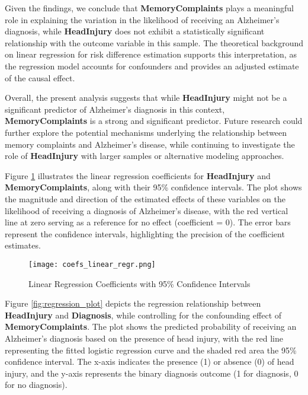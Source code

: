 \documentclass[12pt]{article}
\begin{document}
Given the findings, we conclude that \textbf{MemoryComplaints} plays a meaningful role in explaining the variation in the likelihood of receiving an Alzheimer's diagnosis, while \textbf{HeadInjury} does not exhibit a statistically significant relationship with the outcome variable in this sample. The theoretical background on linear regression for risk difference estimation supports this interpretation, as the regression model accounts for confounders and provides an adjusted estimate of the causal effect.

Overall, the present analysis suggests that while \textbf{HeadInjury} might not be a significant predictor of Alzheimer's diagnosis in this context, \textbf{MemoryComplaints} is a strong and significant predictor. Future research could further explore the potential mechanisms underlying the relationship between memory complaints and Alzheimer's disease, while continuing to investigate the role of \textbf{HeadInjury} with larger samples or alternative modeling approaches.


Figure \ref{fig:coef_plot} illustrates the linear regression coefficients for \textbf{HeadInjury} and \textbf{MemoryComplaints}, along with their 95\% confidence intervals. The plot shows the magnitude and direction of the estimated effects of these variables on the likelihood of receiving a diagnosis of Alzheimer's disease, with the red vertical line at zero serving as a reference for no effect (coefficient = 0). The error bars represent the confidence intervals, highlighting the precision of the coefficient estimates.


\begin{figure}[H]
    \centering
    \texttt{[image: coefs\_linear\_regr.png]}
    \caption{Linear Regression Coefficients with 95\% Confidence Intervals}
    \label{fig:coef_plot}
\end{figure}


Figure \ref{fig:regression_plot} depicts the regression relationship between \textbf{HeadInjury} and \textbf{Diagnosis}, while controlling for the confounding effect of \textbf{MemoryComplaints}. The plot shows the predicted probability of receiving an Alzheimer's diagnosis based on the presence of head injury, with the red line representing the fitted logistic regression curve and the shaded red area the 95\% confidence interval. The x-axis indicates the presence (1) or absence (0) of head injury, and the y-axis represents the binary diagnosis outcome (1 for diagnosis, 0 for no diagnosis).
\end{document}
